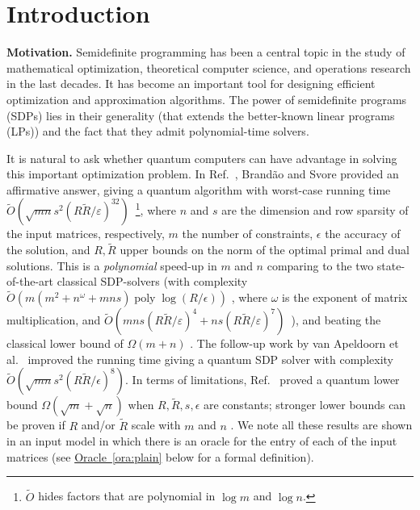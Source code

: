 \documentclass[a4paper,UKenglish,cleveref, autoref]{lipics-v2019}
\theoremstyle{remark}
\numberwithin{equation}{section}
\numberwithin{oracle}{section}
\numberwithin{remark}{section}
\newcommand{\ora}[1]{\hyperref[ora:#1]{Oracle~\ref*{ora:#1}}}
\newcommand{\eps}{\varepsilon}
\DeclareMathOperator{\poly}{poly}
\newcommand{\hd}[1]{\vspace{2mm} \noindent \textbf{#1}}
\def \eps {\epsilon}
\begin{document}

\section{Introduction}
\hd{Motivation.}  Semidefinite programming has been a central topic in the study of mathematical optimization, theoretical computer science, and operations research in the last decades.  It has become an important tool for designing efficient optimization and approximation algorithms. The power of semidefinite programs (SDPs) lies in their generality (that extends the better-known linear programs (LPs)) and the fact that they admit polynomial-time solvers.

It is natural to ask whether quantum computers can have advantage in solving this important optimization problem.
In Ref.~\cite{brandao2016quantum}, Brand\~ao and Svore provided an affirmative answer, giving a quantum algorithm with worst-case running time $\tilde{O}(\sqrt{mn} s^2 (R\tilde{R}/\varepsilon)^{32})$~\footnote{$\tilde{O}$ hides factors that are polynomial in $\log m$ and $\log n$.}, where
$n$ and $s$ are the dimension and row sparsity of the input matrices, respectively,
$m$ the number of constraints, $\eps$ the accuracy of the
solution, and $R, \tilde{R}$ upper bounds on the norm of the optimal primal and dual solutions.
This is a \emph{polynomial} speed-up in $m$ and $n$ comparing to the two state-of-the-art classical SDP-solvers \cite{lee2015faster, arora2007combinatorial} (with complexity $\tilde{O}(m(m^2+n^{\omega}+mns)\poly\log(R/\eps))$ \cite{lee2015faster}, where $\omega$ is the exponent of matrix multiplication, and $\tilde{O}( m n s (R \tilde{R}/\varepsilon)^{4} + n s \left( R \tilde{R}/\varepsilon  \right)^7)$~\cite{arora2007combinatorial}), and beating the classical lower bound of $\Omega(m + n)$ \cite{brandao2016quantum}. The follow-up work by van Apeldoorn et al.~\cite{vanApeldoorn2017quantum} improved the running time giving a quantum SDP solver with complexity $\tilde{O}(\sqrt{mn} s^2 (R\tilde{R}/\eps)^8)$. In terms of limitations, Ref.~\cite{brandao2016quantum} proved a quantum lower bound $\Omega(\sqrt{m}+\sqrt{n})$ when $R,\tilde{R},s,\epsilon$ are constants; stronger lower bounds can be proven if $R$ and/or $\tilde{R}$ scale with $m$ and $n$ \cite{vanApeldoorn2017quantum}. We note all these results are shown in an input model in which there is an oracle for the entry of each of the input matrices (see \ora{plain} below for a formal definition).
\end{document}

